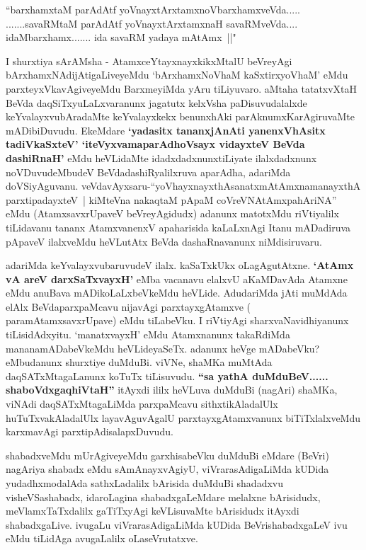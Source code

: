 \begin{shl}
``barxhamxtaM parAdAtf yoV\s nayxtArxtamxnoVbarxhamxveVda.....
.......savaRMtaM parAdAtf yoV\s nayxtArxtamxnaH savaRMveVda....
idaMbarxhamx....... ida savaRM yadaya mAtAmx~||"
\end{shl}

\begin{artha}
I shurxtiya sArAMsha - AtamxceYtayxnayxkikxMtalU beVreyAgi
bArxhamxNAdijAtigaLiveyeMdu `bArxhamxNoV\s haM kaSxtirxyoV\s haM' eMdu parxteyxVkavAgiveyeMdu
 BarxmeyiMda yAru tiLiyuvaro. aMtaha tatatxvXtaH BeVda
daqSiTxyuLaLxvaranunx jagatutx kelxVsha paDisuvudalalxde
keYvalayxvubAradaMte keYvalayxkekx benunxhAki parAknumxKarAgiruvaMte
mADibiDuvudu. EkeMdare \textbf{`yadasitx tananxjAnAti yanenxVhAsitx tadiVkaSxteV' `iteVyxvamaparAdhoV\s sayx vidayxteV BeVda dashiRnaH'} eMdu heVLidaMte idadxdadxnunx\break tiLiyate ilalxdadxnunx noVDuvudeMbudeV BeVdadashiRyalilxruva aparAdha,
adariMda doVSiyAguvanu. veVdavAyxsaru-``yoVhayxnayxthAsanatxmAtAmxnamanayxthA parxti\break padayxteV~| kiMteVna nakaqtaM pApaM coVreVNAtAmxpahAriNA'' eMdu (AtamxsavxrUpaveV
beVreyAgidudx) adanunx matotxMdu riVtiyalilx tiLidavanu tananx
AtamxvanenxV apaharisida kaLaLxnAgi Itanu mADadiruva pApaveV ilalxveMdu
heVLutAtx BeVda dashaRnavanunx niMdisiruvaru.

adariMda keYvalayxvubaruvudeV ilalx. kaSaTxkUkx
oLagAgutAtxne. \textbf{`AtAmx vA areV darxSaTxvayxH'} eMba vacanavu elalxvU aKaMDavAda Atamxne eMdu
anuBava mADikoLaLxbeVkeMdu heVLide. AdudariMda jAti muMdAda elAlx
BeVdaparxpaMcavu nijavAgi parxtayxgAtamxve ( paramAtamxsavxrUpave)
eMdu tiLabeVku. I riVtiyAgi sharxvaNavidhiyanunx
tiLisidAdxyitu. `manatxvayxH' eMdu Atamxnanunx takaRdiMda
mananamADabeVkeMdu heVLideyaSeTx. adanunx heVge mADabeVku? eMbudanunx
shurxtiye duMduBi. viVNe, shaMKa muMtAda daqSATxMtagaLanunx koTuTx
tiLisuvudu. \textbf{``sa yathA duMduBeV...... shaboVdxgaqhiVtaH''} itAyxdi ililx heVLuva duMduBi (nagAri) shaMKa, viNAdi
daqSATxMtagaLiMda parxpaMcavu sithxtikAladalUlx huTuTxvakAladalUlx
layavAguvAgalU parxtayxgAtamxvanunx biTiTxlalxveMdu karxmavAgi
parxtipAdisalapxDuvudu. 

shabadxveMdu mUrAgiveyeMdu garxhisabeVku duMduBi eMdare (BeVri)
 nagAriya shabadx eMdu sAmAnayxvAgiyU, viVrarasAdigaLiMda kUDida
yudadhxmodalAda sathxLadalilx bArisida duMduBi shadadxvu
visheVSashabadx, idaroLagina shabadxgaLeMdare melalxne bArisidudx,
meVlamxTaTxdalilx gaTiTxyAgi keVLisuvaMte bArisidudx itAyxdi
shabadxgaLive. ivugaLu viVrarasAdigaLiMda kUDida BeVrishabadxgaLeV ivu
eMdu tiLidAga avugaLalilx oLaseVrutatxve.


\end{artha}
